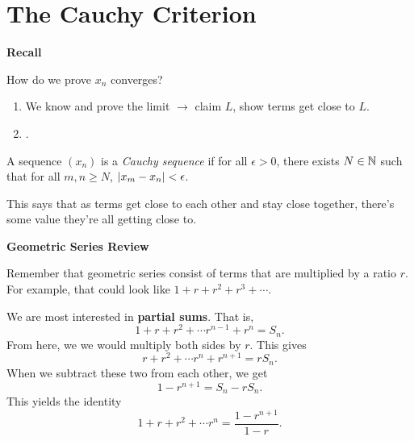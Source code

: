 




\section{The Cauchy Criterion}

\begin{center}
    \textbf{Recall}
\end{center}
How do we prove \(x_n\) converges?
\begin{enumerate}
    \item We know and prove the limit \(\rightarrow\) claim \(L\), show terms get close to \(L\).
    \item {}.
\end{enumerate}

\begin{definition}
    A sequence \((x_n)\) is a \textit{Cauchy sequence} if for all \(\epsilon > 0\), there exists \(N \in \mathbb{N}\) such that for all \(m,n \geq N\), \(\left|x_m - x_n\right| < \epsilon\).
\end{definition}

This says that as terms get close to each other and stay close together, there's some value they're all getting close to.

\begin{center}
    \textbf{Geometric Series Review}
\end{center}

Remember that geometric series consist of terms that are multiplied by a ratio \(r\). For example, that could look like \(1 + r + r^{2} + r^{3} + \cdots\).

We are most interested in \textbf{partial sums}. That is,
\[
    1 + r + r^{2} + \cdots r^{n - 1} + r^{n} = S_{n}.
\]
From here, we we would multiply both sides by \(r\). This gives
\[
    r + r^{2} + \cdots r^{n} + r^{n + 1} = rS_{n}.
\]
When we subtract these two from each other, we get
\[
    1 - r^{n + 1} = S_{n} - rS_{n}.
\]
This yields the identity
\[
    1 + r + r^{2} + \cdots r^{n} = \frac{1-r^{n + 1}}{1 - r}.
\]

